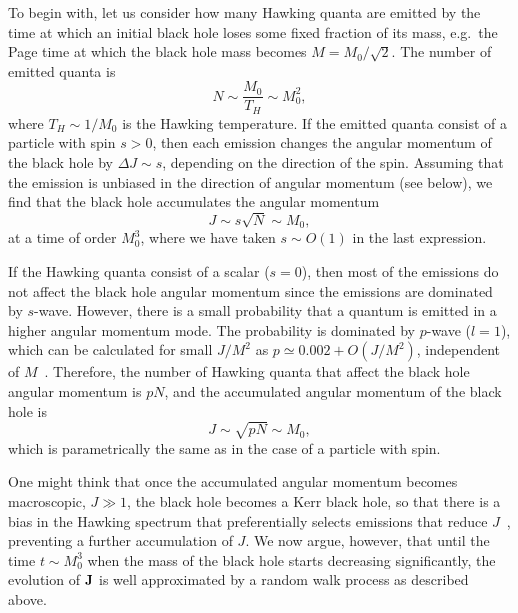 \documentclass[12pt]{article}
\begin{document}
To begin with, let us consider how many Hawking quanta are emitted by 
the time at which an initial black hole loses some fixed fraction of 
its mass, e.g.\ the Page time at which the black hole mass becomes 
$M = M_0/\sqrt{2}$.  The number of emitted quanta is
%
\begin{equation}
  N \sim \frac{M_0}{T_H} \sim M_0^2,
\label{eq:app-N}
\end{equation}
%
where $T_H \sim 1/M_0$ is the Hawking temperature.  If the emitted 
quanta consist of a particle with spin $s > 0$, then each emission 
changes the angular momentum of the black hole by $\varDelta J \sim s$, 
depending on the direction of the spin.  Assuming that the emission is 
unbiased in the direction of angular momentum (see below), we find that 
the black hole accumulates the angular momentum
%
\begin{equation}
  J \sim s \sqrt{N} \sim M_0,
\label{eq:app-J}
\end{equation}
%
at a time of order $M_0^3$, where we have taken $s \sim O(1)$ in the 
last expression.

If the Hawking quanta consist of a scalar ($s=0$), then most of the 
emissions do not affect the black hole angular momentum since the 
emissions are dominated by $s$-wave.  However, there is a small 
probability that a quantum is emitted in a higher angular momentum 
mode.  The probability is dominated by $p$-wave ($l=1$), which can 
be calculated for small $J/M^2$ as $p \simeq 0.002 + O(J/M^2)$, 
independent of $M$~\cite{Starobinskii:1973,Page:1976df}.  Therefore, 
the number of Hawking quanta that affect the black hole angular 
momentum is $p N$, and the accumulated angular momentum of the 
black hole is
%
\begin{equation}
  J \sim \sqrt{p N} \sim M_0,
\label{eq:app-J-scalar}
\end{equation}
%
which is parametrically the same as in the case of a particle with spin.

One might think that once the accumulated angular momentum becomes 
macroscopic, $J \gg 1$, the black hole becomes a Kerr black hole, so 
that there is a bias in the Hawking spectrum that preferentially selects 
emissions that reduce $J$~\cite{Hawking:1974sw}, preventing a further 
accumulation of $J$.  We now argue, however, that until the time $t \sim 
M_0^3$ when the mass of the black hole starts decreasing significantly, 
the evolution of ${\bf J}$ is well approximated by a random walk process 
as described above.
\end{document}
